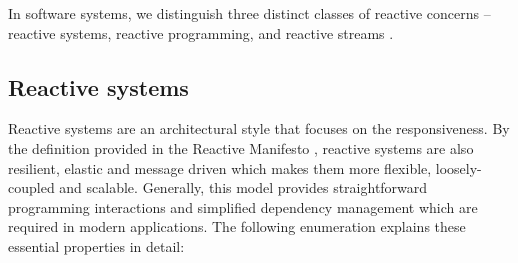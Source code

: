 \documentclass[oneside,
  digital, %
  table,   %
  lof,     %
  lot,     %
]{fithesis3}
\begin{document}
In software systems, we distinguish three distinct classes of reactive concerns -- reactive systems, reactive programming, and reactive streams \cite{reactive_landscape}. 

\subsection{Reactive systems}

Reactive systems are an architectural style that focuses on the responsiveness. By the definition provided in the Reactive Manifesto \cite{reactive_manifesto}, reactive systems are also resilient, elastic and message driven which makes them more flexible, loosely-coupled and scalable. Generally, this model provides straightforward programming interactions and simplified dependency management which are required in modern applications. The following enumeration explains these essential properties in detail:
\end{document}
